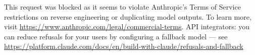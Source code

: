 \noindent This request was blocked as it seems to violate Anthropic's Terms of Service restrictions on reverse engineering or duplicating model outputs. To learn more, visit \url{https://www.anthropic.com/legal/commercial-terms}. API integrators: you can reduce refusals for your users by configuring a fallback model — see \url{https://platform.claude.com/docs/en/build-with-claude/refusals-and-fallback}\par
